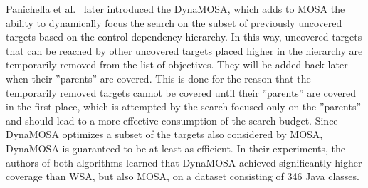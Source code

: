 \documentclass{article}
\begin{document}

Panichella et al.~\cite{Panichella2018} later introduced the \ac{DynaMOSA}, which adds to \ac{MOSA} the ability to dynamically focus the search on the subset of previously uncovered targets based on the control dependency hierarchy. In this way, uncovered targets that can be reached by other uncovered targets placed higher in the hierarchy are temporarily removed from the list of objectives. They will be added back later when their ''parents'' are covered. This is done for the reason that the temporarily removed targets cannot be covered until their ''parents'' are covered in the first place, which is attempted by the search focused only on the ''parents'' and should lead to a more effective consumption of the search budget. Since \ac{DynaMOSA} optimizes a subset of the targets also considered by \ac{MOSA}, \ac{DynaMOSA} is guaranteed to be at least as efficient. In their experiments, the authors of both algorithms learned that \ac{DynaMOSA} achieved significantly higher coverage than \ac{WSA}, but also \ac{MOSA}, on a dataset consisting of 346 Java classes. 
\end{document}
